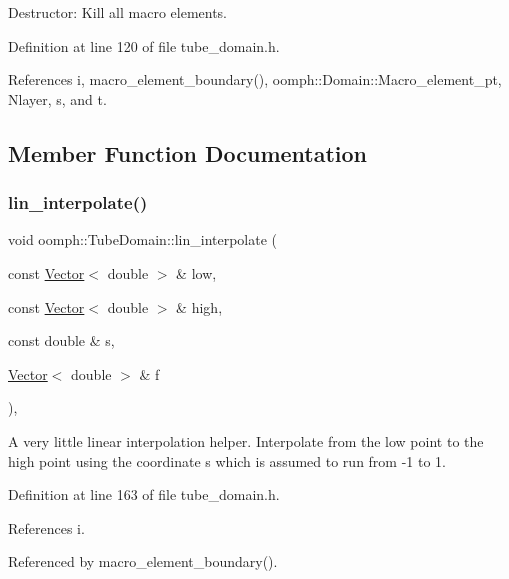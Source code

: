 Destructor\+: Kill all macro elements. 



Definition at line 120 of file tube\+\_\+domain.\+h.



References i, macro\+\_\+element\+\_\+boundary(), oomph\+::\+Domain\+::\+Macro\+\_\+element\+\_\+pt, Nlayer, s, and t.



\subsection{Member Function Documentation}
\mbox{\label{classoomph_1_1TubeDomain_a4e893ffe544f30d0160c41b2aff75d7f}} 
\subsubsection{\texorpdfstring{lin\+\_\+interpolate()}{lin\_interpolate()}}
{\footnotesize\ttfamily void oomph\+::\+Tube\+Domain\+::lin\+\_\+interpolate (\begin{DoxyParamCaption}\item[{const \hyperlink{classoomph_1_1Vector}{Vector}$<$ double $>$ \&}]{low,  }\item[{const \hyperlink{classoomph_1_1Vector}{Vector}$<$ double $>$ \&}]{high,  }\item[{const double \&}]{s,  }\item[{\hyperlink{classoomph_1_1Vector}{Vector}$<$ double $>$ \&}]{f }\end{DoxyParamCaption})\hspace{0.3cm}{\ttfamily [inline]}, {\ttfamily [private]}}



A very little linear interpolation helper. Interpolate from the low point to the high point using the coordinate s which is assumed to run from -\/1 to 1. 



Definition at line 163 of file tube\+\_\+domain.\+h.



References i.



Referenced by macro\+\_\+element\+\_\+boundary().

